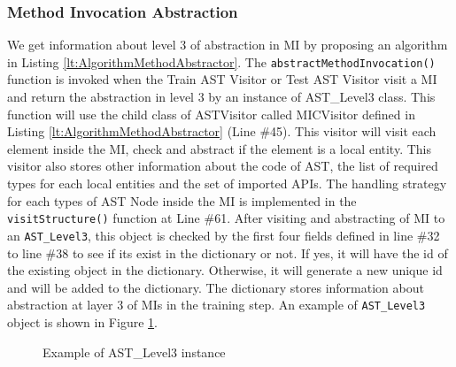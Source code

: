 \subsubsection{Method Invocation Abstraction}
We get information about level 3 of abstraction in MI by proposing an algorithm in Listing \ref{lt:AlgorithmMethodAbstractor}. The \texttt{abstractMethodInvocation()} function is invoked when the Train AST Visitor or Test AST Visitor visit a MI and return the abstraction in level 3 by an instance of AST\_Level3 class. This function will use the child class of ASTVisitor called MICVisitor defined in Listing \ref{lt:AlgorithmMethodAbstractor} (Line \#45). This visitor will visit each element inside the MI, check and abstract if the element is a local entity. This visitor also stores other information about the code of AST, the list of required types for each local entities and the set of imported APIs. The handling strategy for each types of AST Node inside the MI is implemented in the \texttt{visitStructure()} function at Line \#61. After visiting and abstracting of MI to an \texttt{AST\_Level3}, this object is checked by the first four fields defined in line \#32 to line \#38 to see if its exist in the dictionary or not. If yes, it will have the id of the existing object in the dictionary. Otherwise, it will generate a new unique id and will be added to the dictionary. The dictionary stores information about abstraction at layer 3 of MIs in the training step. An example of  \texttt{AST\_Level3} object is shown in Figure \ref{fig:mapping_expression}.

\begin{figure}[]
        \caption{\label{fig:mapping_expression} Example of AST\_Level3 instance}
      \end{figure}



